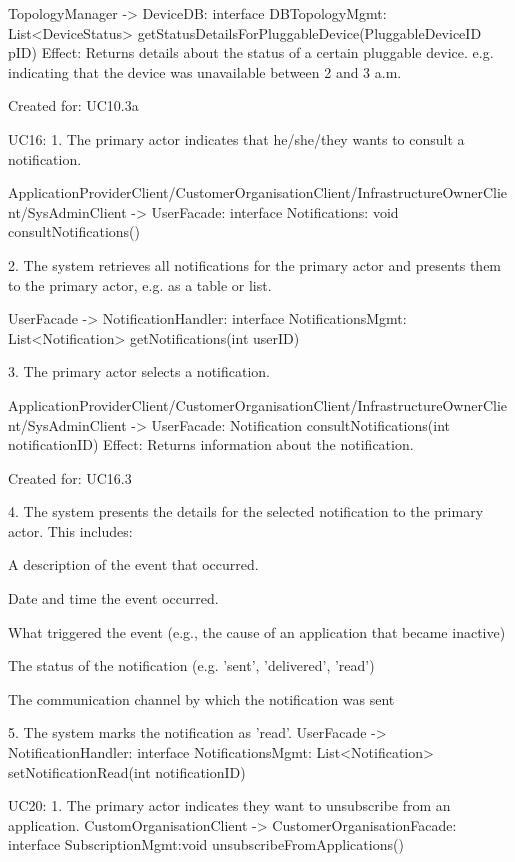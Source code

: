 {{{{{{{{{                TopologyManager -> DeviceDB: interface DBTopologyMgmt: List<DeviceStatus> getStatusDetailsForPluggableDevice(PluggableDeviceID pID)
                    Effect: Returns details about the status of a certain pluggable device. e.g. indicating that the device was unavailable between 2 and 3 a.m.
                    \item Created for: UC10.3a


    UC16:
        1. The primary actor indicates that he/she/they wants to consult a notification.

            ApplicationProviderClient/CustomerOrganisationClient/InfrastructureOwnerClient/SysAdminClient -> UserFacade: interface Notifications: void consultNotifications()

        2. The system retrieves all notifications for the primary actor and presents them to the primary actor, e.g. as a table or list.

            UserFacade -> NotificationHandler: interface NotificationsMgmt: List<Notification> getNotifications(int userID)

        3. The primary actor selects a notification.

            ApplicationProviderClient/CustomerOrganisationClient/InfrastructureOwnerClient/SysAdminClient -> UserFacade: Notification consultNotifications(int notificationID)
                Effect: Returns information about the notification.
                \item Created for: UC16.3

        4. The system presents the details for the selected notification to the primary actor. This includes:
            { A description of the event that occurred.

            { Date and time the event occurred.

            { What triggered the event (e.g., the cause of an application that became inactive)

            { The status of the notification (e.g. 'sent', 'delivered', 'read')

            { The communication channel by which the notification was sent


        5. The system marks the notification as 'read'.
            UserFacade -> NotificationHandler: interface NotificationsMgmt: List<Notification> setNotificationRead(int notificationID)

    UC20:
        1. The primary actor indicates they want to unsubscribe from an application.
            CustomOrganisationClient -> CustomerOrganisationFacade: interface SubscriptionMgmt:void  unsubscribeFromApplications()


}}}}}}}}}}}}}}
